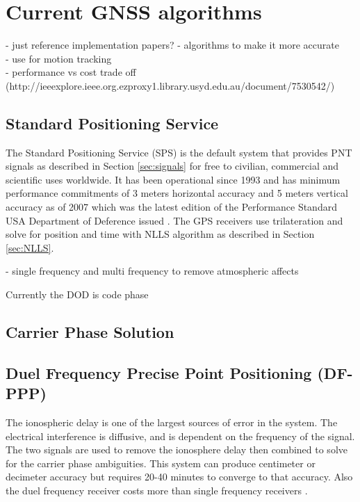 
\section{Current GNSS algorithms}
- just reference implementation papers?
- algorithms to make it more accurate\\
- use for motion tracking\\
- performance vs cost trade off\\
(http://ieeexplore.ieee.org.ezproxy1.library.usyd.edu.au/document/7530542/)

\subsection{Standard Positioning Service}
The Standard Positioning Service (SPS) is the default system that provides PNT signals as described in Section \ref{sec:signals} for free to civilian, commercial and scientific uses worldwide. It has been operational since 1993 and has minimum performance commitments of 3 meters horizontal accuracy and 5 meters vertical accuracy as of 2007 which was the latest edition of the Performance Standard USA Department of Deference issued \cite{officalperformance}. The GPS receivers use trilateration and solve for position and time with NLLS algorithm as described in Section \ref{sec:NLLS}. 

- single frequency and multi frequency to remove atmospheric affects

Currently the DOD is 
code phase

\subsection{Carrier Phase Solution}


\subsection{Duel Frequency Precise Point Positioning (DF-PPP)}
The ionospheric delay is one of the largest sources of error in the system. The electrical interference is diffusive, and is dependent on the frequency of the signal. The two signals are used to remove the ionosphere delay then combined to solve for the carrier phase ambiguities. This system can produce centimeter or decimeter accuracy but requires 20-40 minutes to converge to that accuracy. Also the duel frequency receiver costs more than single frequency receivers \cite{gnsssolutions_dfppp}.


